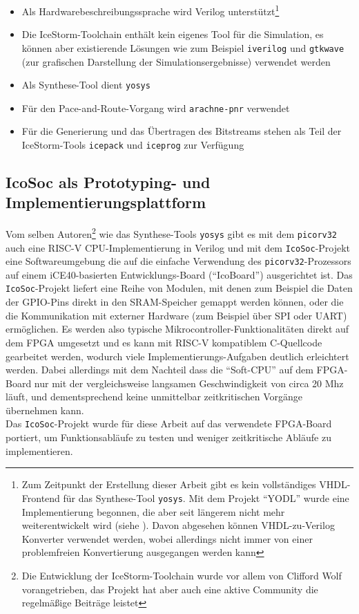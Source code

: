 \begin{itemize}
	\item Als Hardwarebeschreibungssprache wird Verilog unterstützt\footnote{Zum Zeitpunkt der Erstellung dieser Arbeit gibt es kein vollständiges VHDL-Frontend für das Synthese-Tool {\tt yosys}. Mit dem Projekt ``YODL'' wurde eine Implementierung begonnen, die aber seit längerem nicht mehr weiterentwickelt wird (siehe \cite{web:yodl}). Davon abgesehen können VHDL-zu-Verilog Konverter verwendet werden, wobei allerdings nicht immer von einer problemfreien Konvertierung ausgegangen werden kann} 
	\item Die IceStorm-Toolchain enthält kein eigenes Tool für die Simulation, es können aber existierende Lösungen wie zum Beispiel {\tt iverilog}\cite{web:iverilog} und {\tt gtkwave}\cite{web:gtkwave} (zur grafischen Darstellung der Simulationsergebnisse) verwendet werden
	\item Als Synthese-Tool dient {\tt yosys}\cite{web:yosys}
	\item Für den Pace-and-Route-Vorgang wird {\tt arachne-pnr}\cite{web:arachne_pnr} verwendet
	\item Für die Generierung und das Übertragen des Bitstreams stehen als Teil der IceStorm-Tools\cite{web:icestorm_tools} {\tt icepack} und {\tt iceprog} zur Verfügung
\end{itemize}



\subsection{IcoSoc als Prototyping- und Implementierungsplattform} 

Vom selben Autoren\footnote{Die Entwicklung der IceStorm-Toolchain wurde vor allem von Clifford Wolf vorangetrieben, das Projekt hat aber auch eine aktive Community die regelmäßige Beiträge leistet} wie das Synthese-Tools {\tt yosys} gibt es mit dem {\tt picorv32} auch eine RISC-V CPU-Implementierung in Verilog und mit dem {\tt IcoSoc}-Projekt eine Softwareumgebung die auf die einfache Verwendung des {\tt picorv32}-Prozessors auf einem iCE40-basierten Entwicklungs-Board (``IcoBoard'') ausgerichtet ist. Das {\tt IcoSoc}-Projekt liefert eine Reihe von Modulen, mit denen zum Beispiel die Daten der GPIO-Pins direkt in den SRAM-Speicher gemappt werden können, oder die die Kommunikation mit externer Hardware (zum Beispiel über SPI oder UART) ermöglichen. Es werden also typische Mikrocontroller-Funktionalitäten direkt auf dem FPGA umgesetzt und es kann mit RISC-V kompatiblem C-Quellcode gearbeitet werden, wodurch viele Implementierungs-Aufgaben deutlich erleichtert werden. Dabei allerdings mit dem Nachteil dass die ``Soft-CPU'' auf dem FPGA-Board nur mit der vergleichsweise langsamen Geschwindigkeit von circa 20 Mhz läuft, und dementsprechend keine unmittelbar zeitkritischen Vorgänge übernehmen kann.\\
Das {\tt IcoSoc}-Projekt wurde für diese Arbeit auf das verwendete FPGA-Board portiert, um Funktionsabläufe zu testen und weniger zeitkritische Abläufe zu implementieren.




